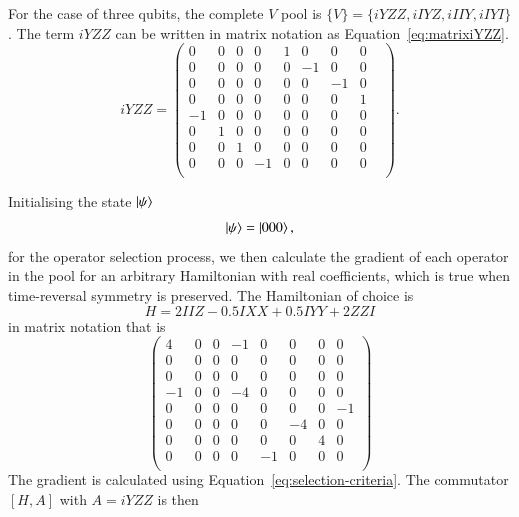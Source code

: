 For the case of three qubits, the complete $ V $ pool is $ \{ V \} = \{iYZZ, iIYZ, iIIY, iIYI\}$. The term $iYZZ$ can be written in matrix notation as Equation~\eqref{eq:matrixiYZZ}.
\begin{equation}
	\label{eq:matrixiYZZ}
	iYZZ = \begin{pmatrix}
	0 & 0 & 0 & 0 & 1 & 0 & 0 & 0 & \\ 
	0 & 0 & 0 & 0 & 0 & -1 & 0 & 0 & \\ 
	0 & 0 & 0 & 0 & 0 & 0 & -1 & 0 & \\ 
	0 & 0 & 0 & 0 & 0 & 0 & 0 & 1 & \\ 
	-1 & 0 & 0 & 0 & 0 & 0 & 0 & 0 & \\ 
	0 & 1 & 0 & 0 & 0 & 0 & 0 & 0 & \\ 
	0 & 0 & 1 & 0 & 0 & 0 & 0 & 0 & \\ 
	0 & 0 & 0 & -1 & 0 & 0 & 0 & 0 & \\ 
	\end{pmatrix}.
\end{equation}


Initialising the state $\ket{\psi}$
\[ \ket{\psi} = \ket{000}, \] 
for the operator selection process, we then calculate the gradient of each operator in the pool for an arbitrary Hamiltonian with real coefficients, which is true when time-reversal symmetry is preserved. The Hamiltonian of choice is
\begin{equation}
	\label{eq:0gradHamiltonian}
	H = 2IIZ - 0.5IXX + 0.5IYY + 2 ZZI
\end{equation}
in matrix notation that is
\begin{equation}
	\label{eq:0gradHmat}
\begin{pmatrix}
4 & 0 & 0 & -1 & 0 & 0 & 0 & 0  \\
0 & 0 & 0 & 0 & 0 & 0 & 0 & 0  \\
0 & 0 & 0 & 0 & 0 & 0 & 0 & 0  \\
-1 & 0 & 0 & -4 & 0 & 0 & 0 & 0  \\
0 & 0 & 0 & 0 & 0 & 0 & 0 & -1  \\
0 & 0 & 0 & 0 & 0 & -4 & 0 & 0  \\
0 & 0 & 0 & 0 & 0 & 0 & 4 & 0  \\
0 & 0 & 0 & 0 & -1 & 0 & 0 & 0  \\
\end{pmatrix}	
\end{equation}
The gradient is calculated using Equation~\eqref{eq:selection-criteria}. The commutator $ [H,A] $ with $ A=iYZZ $ is then

